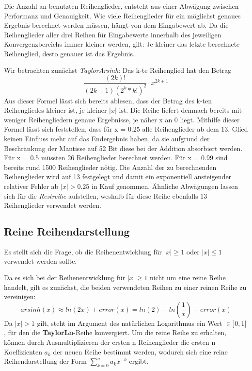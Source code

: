 \documentclass[course=erap] {aspdoc}
\begin{document}
    Die Anzahl an benutzten Reihenglieder, entsteht aus einer Abwägung zwischen Performanz und Genauigkeit.
    Wie viele Reihenglieder für ein möglichst genaues Ergebnis berechnet werden müssen, hängt von dem Eingabewert ab.
    Da die Reihenglieder aller drei Reihen für Eingabewerte innerhalb des jeweiligen Konvergenzbereichs immer kleiner werden, gilt:
    Je kleiner das letzte berechnete Reihenglied, desto genauer ist das Ergebnis.

    Wir betrachten zunächst \textit{TaylorArsinh}:
    Das k-te Reihenglied hat den Betrag
    \[
        \frac{(2k)!}{(2k + 1)(2^k*k!)^2}\cdot x^{2k+1}
    \]
    Aus dieser Formel lässt sich bereits ablesen, dass der Betrag des k-ten Reihengliedes kleiner ist, je kleiner $|x|$ ist.
    Die Reihe liefert demnach bereits mit weniger Reihengliedern genaue Ergebnisse, je näher x an 0 liegt.
    Mithilfe dieser Formel lässt sich feststellen, dass für x = 0.25 alle Reihenglieder ab dem 13. Glied keinen Einfluss mehr auf das Endergebnis haben, da sie aufgrund der Beschränkung der Mantisse auf 52 Bit diese bei der Addition absorbiert werden.
    Für x = 0.5 müssten 26 Reihenglieder berechnet werden.
    Für x = 0.99 sind bereits rund 1500 Reihenglieder nötig.
    Die Anzahl der zu berechnenden Reihenglieder wird auf 13 festgelegt und damit ein exponentiell ansteigender relativer Fehler ab $|x|>0.25$ in Kauf genommen.
    Ähnliche Abwägungen lassen sich für die \textit{Restreihe} aufstellen, weshalb für diese Reihe ebenfalls 13 Reihenglieder verwendet werden.

    \subsection{Reine Reihendarstellung}\label{subsec:reine-reihendarstellung}

    Es stellt sich die Frage, ob die Reihenentwicklung für $|x|\geq1$ oder $|x|\leq1$ verwendet werden sollte. 
    
    Da es sich bei der Reihenentwicklung für $|x|\geq1$ nicht um eine reine Reihe handelt, gilt es zunächst, die beiden verwendeten Reihen zu einer reinen Reihe zu vereinigen:
    \[
        arsinh(x)\approx ln(2x) + error(x) = ln(2) - ln(\frac{1}{x}) + error(x)
    \]
    Da $|x|>1$ gilt, steht im Argument des natürlichen Logarithmus ein Wert $\in ]0, 1]$, für den die \textbf{TaylorLn}-Reihe konvergiert.
    Um die reine Reihe zu erhalten, können durch Ausmultiplizieren der ersten n Reihenglieder die ersten n Koeffizienten $a_k$ der neuen Reihe bestimmt werden, wodurch sich eine reine Reihendarstellung der Form $\sum_{k=0}^{n} a_k x^{-k}$ ergibt.
\end{document}
